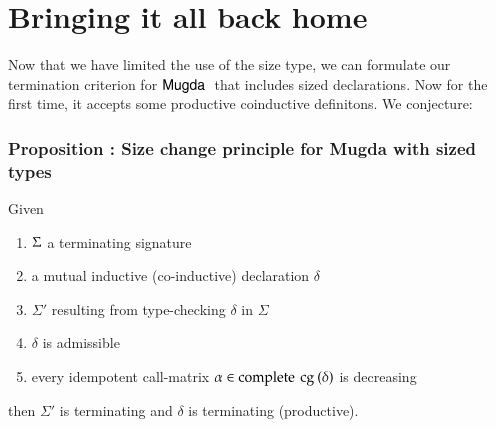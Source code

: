 \section{Bringing it all back home}
Now that we have limited the use of the size type, we can formulate our termination criterion for 
$\textsf{Mugda }$ that includes sized declarations. Now for the first time, it accepts some productive coinductive definitons.
\noindent We conjecture:
\subsubsection{Proposition : Size change principle for Mugda with sized types}
Given
\begin{enumerate}
\item
$\Sigma$ a terminating signature
\item
a mutual inductive (co-inductive) declaration $\delta$
\item
$\Sigma'$ resulting from type-checking $\delta$ in $\Sigma$
\item
$\delta$ is admissible
\item
every idempotent call-matrix $ \alpha \in \operatorname{complete}\: \operatorname{cg}\:(\delta)$ is decreasing
\end{enumerate}
then $\Sigma'$ is terminating and $\delta$ is terminating (productive). 


